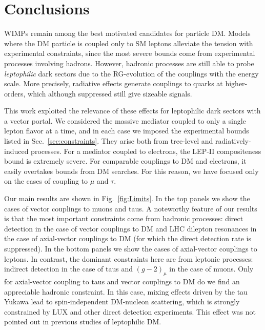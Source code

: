 \documentclass[final,5p,twocolumn]{elsarticle}
\begin{document}
\section{Conclusions}
\label{sec:conclusions}

WIMPs remain among the best motivated candidates for particle DM. Models where the DM particle is coupled only to SM leptons alleviate the tension with experimental constraints, since the most severe bounds come from experimental processes involving hadrons. However, hadronic processes are still able to probe {\it leptophilic} dark sectors due to the RG-evolution of the couplings with the energy scale. More precisely, radiative effects generate couplings to quarks at higher-orders, which although suppressed still give sizeable signals. 

This work exploited the relevance of these effects for leptophilic dark sectors with a vector portal. We considered the massive mediator coupled to only a single lepton flavor at a time, and in each case we imposed the experimental bounds listed in Sec.~\ref{sec:constraints}. They arise both from tree-level and radiatively-induced processes. For a mediator coupled to electrons, the LEP-II compositeness bound is extremely severe. For comparable couplings to DM and electrons, it easily overtakes bounds from DM searches. For this reason, we have focused only on the cases of coupling to $\mu$ and $\tau$. 

Our main results are shown in Fig.~\ref{fig:Limits}. In the top panels we show the cases of vector couplings to muons and taus. A noteworthy feature of our results is that the most important constraints come from hadronic processes: direct detection in the case of vector couplings to DM and LHC dilepton resonances in the case of axial-vector couplings to DM (for which the direct detection rate is suppressed). In the bottom panels we show the cases of axial-vector couplings to leptons. In contrast, the dominant constraints here are from leptonic processes: indirect detection in the case of taus and $(g-2)_\mu$ in the case of muons. Only for axial-vector coupling to taus and vector couplings to DM do we find an appreciable hadronic constraint. In this case, mixing effects driven by the tau Yukawa lead to spin-independent DM-nucleon scattering, which is strongly constrained by LUX and other direct detection experiments. This effect was not pointed out in previous studies of leptophilic DM. 
\end{document}
